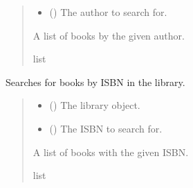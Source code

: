 \documentclass[letterpaper,10pt,english,openany,oneside]{sphinxmanual}
\begin{document}
\begin{fulllineitems}
\begin{fulllineitems}
\begin{quote}
\begin{description}
\begin{itemize}
\item {} 
\sphinxAtStartPar
{} () \textendash{} The author to search for.

\end{itemize}

\sphinxAtStartPar
A list of books by the given author.

\sphinxAtStartPar
list

\end{description}\end{quote}

\end{fulllineitems}


\begin{fulllineitems}
\label{\detokenize{book:book.Book.search_by_isbn}}
\pysigstartsignatures
{}
\pysigstopsignatures
\sphinxAtStartPar
Searches for books by ISBN in the library.
\begin{quote}\begin{description}
\begin{itemize}
\item {} 
\sphinxAtStartPar
{} ({\hyperref[\detokenize{library:library.Library}]{}}) \textendash{} The library object.

\item {} 
\sphinxAtStartPar
{} () \textendash{} The ISBN to search for.

\end{itemize}

\sphinxAtStartPar
A list of books with the given ISBN.

\sphinxAtStartPar
list

\end{description}\end{quote}


\end{fulllineitems}
\end{fulllineitems}
\end{document}
